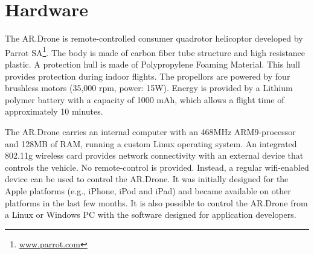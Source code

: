 \section{Hardware}
The AR.Drone is remote-controlled consumer quadrotor helicoptor developed by Parrot SA\footnote{\url{www.parrot.com}}.
The body is made of carbon fiber tube structure and high resistance 
plastic.
A protection hull is made of Polypropylene Foaming Material.
This hull provides protection during indoor flights.
The propellors are powered by four brushless motors (35,000 rpm, power: 15W).
Energy is provided by a Lithium polymer battery with a capacity of 1000 mAh, which allows a flight time of approximately 10 minutes.

The AR.Drone carries an internal computer with an 468MHz ARM9-processor and 128MB of RAM, running a custom Linux operating system.
An integrated 802.11g wireless card provides network connectivity with an external device that controls the vehicle.
No remote-control is provided. Instead, a regular wifi-enabled device can be used to control the AR.Drone.
It was initially designed for the Apple platforms (e.g., iPhone, iPod and iPad) and became available on other platforms in the last few months.
It is also possible to control the AR.Drone from a Linux or Windows PC with the software designed for application developers.



